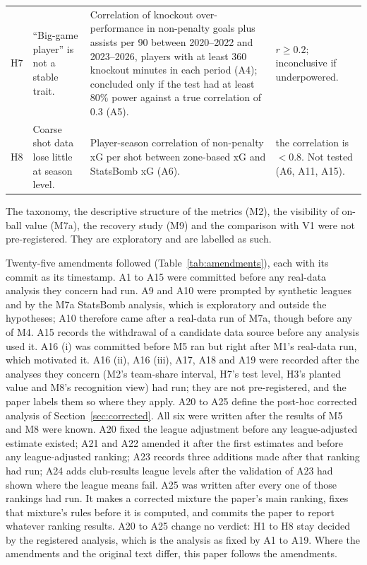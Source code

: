 \documentclass[11pt,a4paper]{article}
\begin{document}
{\begin{longtable}{@{}L{0.6cm}L{3.1cm}L{7.4cm}L{3.5cm}@{}}
H7 & ``Big-game player'' is not a stable trait. & Correlation of knockout over-performance in non-penalty goals plus assists per 90 between 2020--2022 and 2023--2026, players with at least 360 knockout minutes in each period (A4); concluded only if the test had at least 80\% power against a true correlation of 0.3 (A5). & $r \ge 0.2$; inconclusive if underpowered. \\
H8 & Coarse shot data lose little at season level. & Player-season correlation of non-penalty xG per shot between zone-based xG and StatsBomb xG (A6). & the correlation is $< 0.8$. Not tested (A6, A11, A15). \\
\end{longtable}
}

The taxonomy, the descriptive structure of the metrics (M2), the visibility of
on-ball value (M7a), the recovery study (M9) and the comparison with V1 were
not pre-registered. They are exploratory and are labelled as such.

Twenty-five amendments followed (Table~\ref{tab:amendments}), each with its
commit as its timestamp. A1 to A15 were committed before any real-data analysis
they concern had run. A9 and A10 were prompted by synthetic leagues and by the
M7a StatsBomb analysis, which is exploratory and outside the hypotheses; A10
therefore came after a real-data run of M7a, though before any of M4. A15
records the withdrawal of a candidate data source before any analysis used it.
A16 (i) was committed before M5 ran but right after M1's real-data run, which
motivated it. A16 (ii), A16 (iii), A17, A18 and A19 were recorded after the
analyses they concern (M2's team-share interval, H7's test level, H3's
planted value and M8's recognition view) had run; they are not
pre-registered, and the paper labels them so where they apply. A20 to A25
define the post-hoc corrected analysis of Section~\ref{sec:corrected}. All
six were written after the results of M5 and M8 were known. A20 fixed the
league adjustment before any league-adjusted estimate existed; A21 and A22
amended it after the first estimates and before any league-adjusted ranking;
A23 records three additions made after that ranking had run; A24 adds
club-results league levels after the validation of A23 had shown where the
league means fail. A25 was written after every one of those rankings had run.
It makes a corrected mixture the paper's main ranking, fixes that mixture's
rules before it is computed, and commits the paper to report whatever ranking
results. A20 to A25 change no verdict: H1 to H8 stay decided by the registered
analysis, which is the analysis as fixed by A1 to A19. Where the amendments
and the original text differ, this paper follows the amendments.
\end{document}
